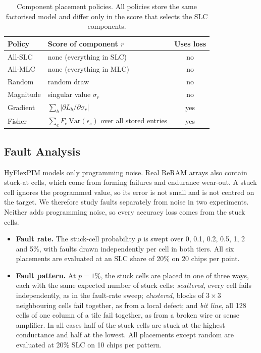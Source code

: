 \documentclass[conference]{IEEEtran}
\begin{document}
\begin{table}[t]
\caption{Component placement policies. All policies store the same factorised model and differ only in the
score that selects the SLC components.}
\label{tab:policies}
\centering
\small
\begin{tabular}{@{}lp{1.45in}c@{}}
\toprule
Policy & Score of component $r$ & Uses loss \\
\midrule
All-SLC    & none (everything in SLC)                    & no  \\
All-MLC    & none (everything in MLC)                    & no  \\
Random     & random draw                                 & no  \\
Magnitude  & singular value $\sigma_r$                   & no  \\
Gradient   & $\sum_b|\partial L_b/\partial\sigma_r|$     & yes \\
Fisher     & $\sum_e F_e\,\mathrm{Var}(\epsilon_e)$ over all stored entries & yes \\
\bottomrule
\end{tabular}
\end{table}

\subsection{Fault Analysis}
HyFlexPIM models only programming noise. Real ReRAM arrays also contain stuck-at cells, which come from
forming failures and endurance wear-out. A stuck cell ignores the programmed value, so its error is not
small and is not centred on the target. We therefore study faults separately from noise in two
experiments. Neither adds programming noise, so every accuracy loss
comes from the stuck cells.
\begin{itemize}
\item \textbf{Fault rate.} The stuck-cell probability $p$ is swept over 0, 0.1, 0.2, 0.5, 1, 2 and 5\%, with
faults drawn independently per cell in both tiers. All six placements are evaluated at an SLC share of
20\% on 20 chips per point.
\item \textbf{Fault pattern.} At $p=1\%$, the stuck cells are placed in one of three ways, each with the
same expected number of stuck cells:
\emph{scattered}, every cell fails independently, as in the fault-rate sweep;
\emph{clustered}, blocks of $3\times3$ neighbouring cells fail together, as from a local defect; and
\emph{bit line}, all 128 cells of one column of a tile fail together, as from a broken wire or sense
amplifier.
In all cases half of the stuck cells are stuck at the highest conductance and half at the lowest.
All placements except random are evaluated at 20\% SLC on 10 chips per pattern.
\end{itemize}
\end{document}
